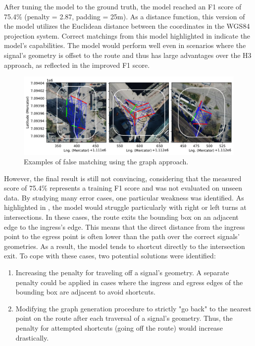 After tuning the model to the ground truth, the model reached an F1 score of 75.4\% (penalty = 2.87, padding = 25m). As a distance function, this version of the model utilizes the Euclidean distance between the coordinates in the WGS84 projection system. Correct matchings from this model highlighted in  indicate the model's capabilities. The model would perform well even in scenarios where the signal's geometry is offset to the route and thus has large advantages over the H3 approach, as reflected in the improved F1 score.

\begin{figure}[htbp]
\centering
\includegraphics[width=\linewidth]{images/matching-dijkstra-incorrect.pdf}
\caption{Examples of false matching using the graph approach.}
\label{fig:sg-selection-graph-fails}
\end{figure}

However, the final result is still not convincing, considering that the measured score of 75.4\% represents a training F1 score and was not evaluated on unseen data. By studying many error cases, one particular weakness was identified. As highlighted in , the model would struggle particularly with right or left turns at intersections. In these cases, the route exits the bounding box on an adjacent edge to the ingress's edge. This means that the direct distance from the ingress point to the egress point is often lower than the path over the correct signals' geometries. As a result, the model tends to shortcut directly to the intersection exit. To cope with these cases, two potential solutions were identified:

\begin{enumerate}
    \item Increasing the penalty for traveling off a signal's geometry. A separate penalty could be applied in cases where the ingress and egress edges of the bounding box are adjacent to avoid shortcuts.
    \item  Modifying the graph generation procedure to strictly "go back" to the nearest point on the route after each traversal of a signal's geometry. Thus, the penalty for attempted shortcuts (going off the route) would increase drastically.
\end{enumerate}

